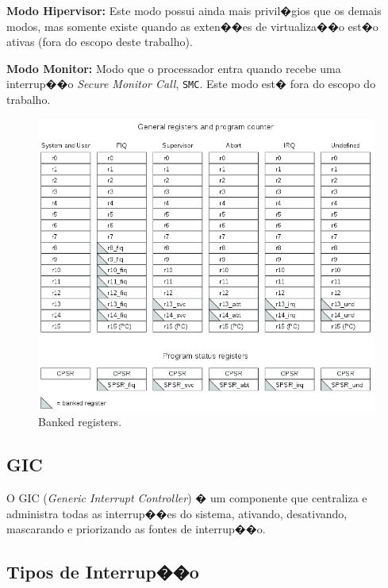 \documentclass{ufscThesis/ufscThesis} %
\begin{document}
\textbf{Modo Hipervisor:} Este modo possui ainda mais privil�gios que os demais modos, mas somente existe quando as exten��es de virtualiza��o est�o ativas (fora do escopo deste trabalho).

\textbf{Modo Monitor:} Modo que o processador entra quando recebe uma interrup��o \emph{Secure Monitor Call}, \verb+SMC+. Este modo est� fora do escopo do trabalho.


\begin{figure}[ht!]
    \centering
    \includegraphics[width=12cm]{figuras/banked_registers}
    \caption{Banked registers.}
\end{figure}

\subsection{GIC}
O GIC (\emph{Generic Interrupt Controller}) � um componente que centraliza e administra todas as interrup��es do sistema, ativando, desativando, mascarando e priorizando as fontes de interrup��o.

\subsection{Tipos de Interrup��o} %
\end{document}

